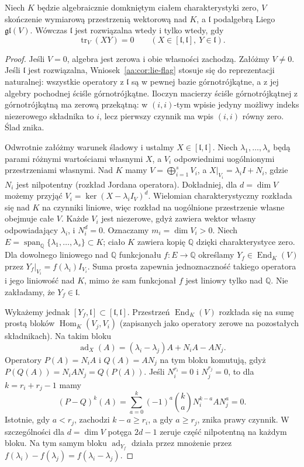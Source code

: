\begin{twierdzenie}
\label{aa:tw:cartan-linear}
Niech $K$ będzie algebraicznie domkniętym ciałem
charakterystyki zero, $V$ skończenie wymiarową
przestrzenią wektorową nad $K$, a $\mathfrak l$
podalgebrą Liego $\mathfrak{gl}(V)$. Wówczas $\mathfrak l$ jest
rozwiązalna wtedy i tylko wtedy, gdy
\[
 \operatorname{tr}_V(XY)=0\qquad
 (X\in[\mathfrak l,\mathfrak l],\ Y\in\mathfrak l).
\]
\end{twierdzenie}
\begin{proof}
Jeśli $V=0$, algebra jest zerowa i obie własności
zachodzą. Załóżmy $V\ne0$. Jeśli $\mathfrak l$
jest rozwiązalna, Wniosek~\ref{aa:cor:lie-flag}
stosuje się do reprezentacji naturalnej: wszystkie
operatory z $\mathfrak l$ są w pewnej bazie
górnotrójkątne, a z jej algebry pochodnej ściśle
górnotrójkątne. Iloczyn macierzy ściśle
górnotrójkątnej z górnotrójkątną ma zerową
przekątną: w $(i,i)$-tym wpisie jedyny możliwy
indeks niezerowego składnika to $i$, lecz pierwszy
czynnik ma wpis $(i,i)$ równy zero. Ślad znika.

Odwrotnie załóżmy warunek śladowy i ustalmy
$X\in[\mathfrak l,\mathfrak l]$. Niech
$\lambda_1,\ldots,\lambda_s$ będą parami różnymi
wartościami własnymi $X$, a $V_i$ odpowiednimi
uogólnionymi przestrzeniami własnymi. Nad $K$
mamy $V=\bigoplus_{i=1}^s V_i$, a
$X|_{V_i}=\lambda_i I+N_i$, gdzie $N_i$ jest
nilpotentny (rozkład Jordana operatora).
Dokładniej, dla $d=\dim V$ możemy przyjąć
$V_i=\ker(X-\lambda_i I_V)^d$. Wielomian
charakterystyczny rozkłada się nad $K$ na czynniki
liniowe, więc rozkład na uogólnione przestrzenie
własne obejmuje całe $V$. Każde $V_i$ jest
niezerowe, gdyż zawiera wektor własny odpowiadający
$\lambda_i$, i $N_i^d=0$. Oznaczamy $m_i=\dim V_i>0$.
Niech $E=\operatorname{span}_{\mathbb Q}
\{\lambda_1,\ldots,\lambda_s\}\subset K$;
ciało $K$ zawiera kopię $\mathbb Q$ dzięki
charakterystyce zero. Dla dowolnego liniowego
nad $\mathbb Q$ funkcjonału $f:E\to\mathbb Q$
określamy $Y_f\in\operatorname{End}_K(V)$
przez $Y_f|_{V_i}=f(\lambda_i)I_{V_i}$.
Suma prosta zapewnia jednoznaczność takiego operatora
i jego liniowość nad $K$, mimo że sam funkcjonał
$f$ jest liniowy tylko nad $\mathbb Q$.
Nie zakładamy, że $Y_f\in\mathfrak l$.

Wykażemy jednak
$[Y_f,\mathfrak l]\subset[\mathfrak l,\mathfrak l]$.
Przestrzeń $\operatorname{End}_K(V)$ rozkłada się
na sumę prostą bloków $\operatorname{Hom}_K(V_j,V_i)$
(zapisanych jako operatory zerowe na pozostałych
składnikach). Na takim bloku
\[
 \operatorname{ad}_X(A)=(\lambda_i-\lambda_j)A
                         +N_iA-AN_j.
\]
Operatory $P(A)=N_i A$ i $Q(A)=AN_j$ na tym bloku
komutują, gdyż $P(Q(A))=N_iAN_j=Q(P(A))$.
Jeśli $N_i^{r_i}=0$ i $N_j^{r_j}=0$, to dla
$k=r_i+r_j-1$ mamy
\[
 (P-Q)^k(A)=\sum_{a=0}^k(-1)^a
      \binom{k}{a}N_i^{k-a}AN_j^a=0.
\]
Istotnie, gdy $a<r_j$, zachodzi $k-a\ge r_i$,
a gdy $a\ge r_j$, znika prawy czynnik. W szczególności dla
$d=\dim V$ potęga $2d-1$ zeruje część nilpotentną
na każdym bloku. Na tym samym bloku
$\operatorname{ad}_{Y_f}$ działa przez mnożenie
przez $f(\lambda_i)-f(\lambda_j)=f(\lambda_i-\lambda_j)$.


\end{proof}
